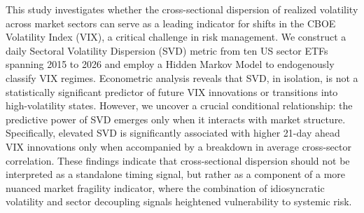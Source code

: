 \documentclass[]{article}
\begin{document}
This study investigates whether the cross-sectional dispersion of realized volatility across market sectors can serve as a leading indicator for shifts in the CBOE Volatility Index (VIX), a critical challenge in risk management. We construct a daily Sectoral Volatility Dispersion (SVD) metric from ten US sector ETFs spanning 2015 to 2026 and employ a Hidden Markov Model to endogenously classify VIX regimes. Econometric analysis reveals that SVD, in isolation, is not a statistically significant predictor of future VIX innovations or transitions into high-volatility states. However, we uncover a crucial conditional relationship: the predictive power of SVD emerges only when it interacts with market structure. Specifically, elevated SVD is significantly associated with higher 21-day ahead VIX innovations only when accompanied by a breakdown in average cross-sector correlation. These findings indicate that cross-sectional dispersion should not be interpreted as a standalone timing signal, but rather as a component of a more nuanced market fragility indicator, where the combination of idiosyncratic volatility and sector decoupling signals heightened vulnerability to systemic risk.
\end{document}
